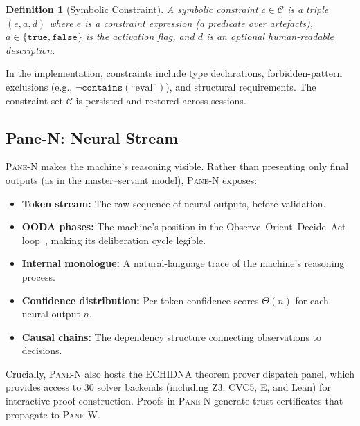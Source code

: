 \documentclass[11pt,a4paper]{article}
\newtheorem{definition}{Definition}[section]
\newcommand{\paneN}{\textsc{Pane-N}}
\newcommand{\paneW}{\textsc{Pane-W}}
\begin{document}
\begin{definition}[Symbolic Constraint]\label{def:constraint}
A symbolic constraint $c \in \mathcal{C}$ is a triple
$(e, a, d)$ where $e$ is a constraint expression (a predicate
over artefacts), $a \in \{\texttt{true}, \texttt{false}\}$ is
the activation flag, and $d$ is an optional human-readable
description.
\end{definition}

In the implementation, constraints include type declarations,
forbidden-pattern exclusions (e.g., $\lnot\texttt{contains}(\text{``eval''})$),
and structural requirements. The constraint set $\mathcal{C}$ is
persisted and restored across sessions.

\subsection{Pane-N: Neural Stream}

\paneN{} makes the machine's reasoning visible. Rather than
presenting only final outputs (as in the master--servant model),
\paneN{} exposes:

\begin{itemize}
  \item \textbf{Token stream:} The raw sequence of neural outputs,
    before validation.
  \item \textbf{OODA phases:} The machine's position in the
    Observe--Orient--Decide--Act
    loop~\citep{boyd1996essence}, making its deliberation
    cycle legible.
  \item \textbf{Internal monologue:} A natural-language trace of
    the machine's reasoning process.
  \item \textbf{Confidence distribution:} Per-token confidence
    scores $\Theta(n)$ for each neural output $n$.
  \item \textbf{Causal chains:} The dependency structure connecting
    observations to decisions.
\end{itemize}

Crucially, \paneN{} also hosts the ECHIDNA theorem prover
dispatch panel, which provides access to 30 solver backends
(including Z3, CVC5, E, and Lean) for interactive proof
construction. Proofs in \paneN{} generate trust certificates
that propagate to \paneW{}.
\end{document}
